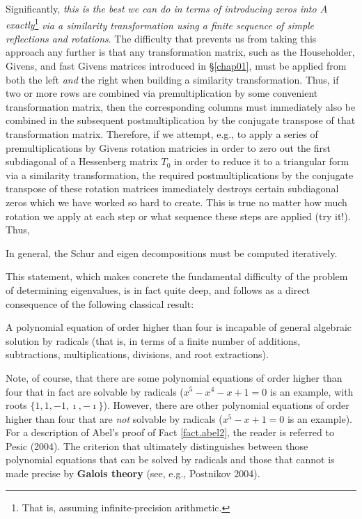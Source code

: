 Significantly, {\it this is the best we can do in terms of introducing zeros into $A$ exactly}\footnote{That is, assuming infinite-precision
arithmetic.} {\it via a similarity transformation using a finite sequence of simple reflections and rotations}.  The difficulty that prevents
us from taking this approach any further is that any transformation matrix, such as the Householder, Givens, and fast Givens matrices introduced in
\S \ref{chap01}, must be applied from both the left {\it and} the right when building a similarity transformation.  Thus, if two or more rows are combined
via premultiplication by some convenient transformation matrix, then the corresponding columns must immediately also be combined in the subsequent
postmultiplication by the 
conjugate transpose of that transformation matrix.  Therefore, if we attempt, e.g., to apply a series of premultiplications by Givens rotation matricies in
order to zero out the first subdiagonal of a Hessenberg matrix $T_0$ in order to reduce it to a triangular form via a similarity transformation, the required
postmultiplications by the conjugate transpose of these rotation matrices immediately destroys certain subdiagonal zeros which we have worked so hard
to create.  This is true no matter how much rotation we apply at each step or what sequence these steps are applied (try it!).  Thus,

\begin{fact} \label{fact.abel1}
In general, the Schur and eigen decompositions must be computed iteratively.
\end{fact}

\noindent This statement, which makes concrete the fundamental difficulty of the problem of determining eigenvalues,
is in fact quite deep, and follows as a direct consequence of the following classical result: 

\begin{fact} \label{fact.abel2} 
A polynomial equation of order higher than four is incapable of general algebraic solution by radicals
(that is, in terms of a finite number of additions, subtractions, multiplications, divisions, and root extractions). 
\end{fact}

\noindent Note, of course, that there are some polynomial equations of order higher than four that in fact are solvable
by radicals ($x^5-x^4-x+1=0$ is an example, with roots $\{1,1,-1,\imath,-\imath\}$).
However, there are other polynomial equations of order higher than four that are {\it not} solvable by radicals ($x^5-x+1=0$ is an example).
For a description of Abel's proof of Fact \ref{fact.abel2}, the reader is referred to Pesic (2004).
The criterion that ultimately distinguishes between those polynomial equations that can be solved by radicals and those that cannot is made precise
by {\bf Galois theory} (see, e.g., Postnikov 2004).

